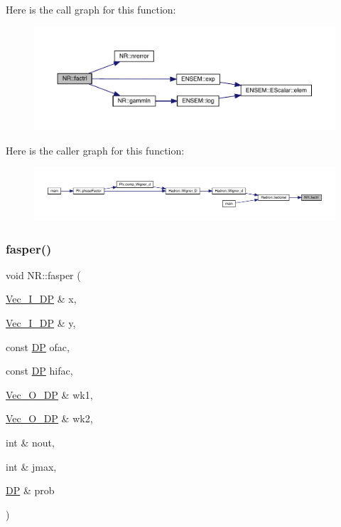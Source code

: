 Here is the call graph for this function\+:
\nopagebreak
\begin{figure}[H]
\begin{center}
\leavevmode
\includegraphics[width=350pt]{da/d46/namespaceNR_ac76d8c81ea3f7dacb7bc39f8f2e67f0a_cgraph}
\end{center}
\end{figure}
Here is the caller graph for this function\+:
\nopagebreak
\begin{figure}[H]
\begin{center}
\leavevmode
\includegraphics[width=350pt]{da/d46/namespaceNR_ac76d8c81ea3f7dacb7bc39f8f2e67f0a_icgraph}
\end{center}
\end{figure}
\mbox{\label{namespaceNR_a28ce9fba247ed103e2ffb545d671840e}} 
\subsubsection{\texorpdfstring{fasper()}{fasper()}}
{\footnotesize\ttfamily void N\+R\+::fasper (\begin{DoxyParamCaption}\item[{\mbox{\hyperlink{namespaceNR_a9f943da53862537c552e2a770cb170ae}{Vec\+\_\+\+I\+\_\+\+DP}} \&}]{x,  }\item[{\mbox{\hyperlink{namespaceNR_a9f943da53862537c552e2a770cb170ae}{Vec\+\_\+\+I\+\_\+\+DP}} \&}]{y,  }\item[{const \mbox{\hyperlink{namespaceNR_af6ff762dd605ff477b8e52387253a02a}{DP}}}]{ofac,  }\item[{const \mbox{\hyperlink{namespaceNR_af6ff762dd605ff477b8e52387253a02a}{DP}}}]{hifac,  }\item[{\mbox{\hyperlink{namespaceNR_a970094d23441f8ef6a45282a7eb2103d}{Vec\+\_\+\+O\+\_\+\+DP}} \&}]{wk1,  }\item[{\mbox{\hyperlink{namespaceNR_a970094d23441f8ef6a45282a7eb2103d}{Vec\+\_\+\+O\+\_\+\+DP}} \&}]{wk2,  }\item[{int \&}]{nout,  }\item[{int \&}]{jmax,  }\item[{\mbox{\hyperlink{namespaceNR_af6ff762dd605ff477b8e52387253a02a}{DP}} \&}]{prob }\end{DoxyParamCaption})}

